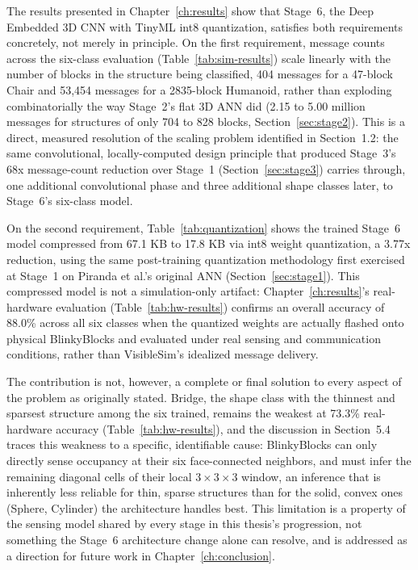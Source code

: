 \documentclass[12pt,a4paper]{report}
\begin{document}
The results presented in Chapter~\ref{ch:results} show that Stage~6, the Deep Embedded 3D CNN with TinyML int8 quantization, satisfies both requirements concretely, not merely in principle. On the first requirement, message counts across the six-class evaluation (Table~\ref{tab:sim-results}) scale linearly with the number of blocks in the structure being classified, 404 messages for a 47-block Chair and 53,454 messages for a 2835-block Humanoid, rather than exploding combinatorially the way Stage~2's flat 3D ANN did (2.15 to 5.00 million messages for structures of only 704 to 828 blocks, Section~\ref{sec:stage2}). This is a direct, measured resolution of the scaling problem identified in Section~1.2: the same convolutional, locally-computed design principle that produced Stage~3's 68x message-count reduction over Stage~1 (Section~\ref{sec:stage3}) carries through, one additional convolutional phase and three additional shape classes later, to Stage~6's six-class model.

On the second requirement, Table~\ref{tab:quantization} shows the trained Stage~6 model compressed from 67.1 KB to 17.8 KB via int8 weight quantization, a 3.77x reduction, using the same post-training quantization methodology first exercised at Stage~1 on Piranda et al.'s original ANN (Section~\ref{sec:stage1}). This compressed model is not a simulation-only artifact: Chapter~\ref{ch:results}'s real-hardware evaluation (Table~\ref{tab:hw-results}) confirms an overall accuracy of 88.0\% across all six classes when the quantized weights are actually flashed onto physical BlinkyBlocks and evaluated under real sensing and communication conditions, rather than VisibleSim's idealized message delivery.

The contribution is not, however, a complete or final solution to every aspect of the problem as originally stated. Bridge, the shape class with the thinnest and sparsest structure among the six trained, remains the weakest at 73.3\% real-hardware accuracy (Table~\ref{tab:hw-results}), and the discussion in Section~5.4 traces this weakness to a specific, identifiable cause: BlinkyBlocks can only directly sense occupancy at their six face-connected neighbors, and must infer the remaining diagonal cells of their local $3\times3\times3$ window, an inference that is inherently less reliable for thin, sparse structures than for the solid, convex ones (Sphere, Cylinder) the architecture handles best. This limitation is a property of the sensing model shared by every stage in this thesis's progression, not something the Stage~6 architecture change alone can resolve, and is addressed as a direction for future work in Chapter~\ref{ch:conclusion}.
\end{document}
